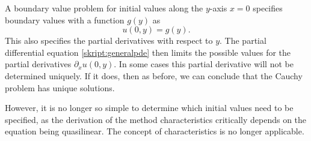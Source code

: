 A boundary value problem for initial values along the $y$-axis
$x=0$ specifies boundary values with a function $g(y)$ as
\[
u(0,y)=g(y).
\]
This also specifies the partial derivatives with respect to $y$.
The partial differential equation \eqref{skript:generalpde} then
limits the possible values for the partial derivatives
$\partial_xu(0,y)$.
In some cases this partial derivative will not be determined uniquely.
If it does, then as before, we can conclude that the Cauchy problem 
has unique solutions.

However, it is no longer so simple to determine which initial values
need to be specified, as the derivation of the method characteristics
critically depends on the equation being quasilinear.
The concept of characteristics is no longer applicable.


